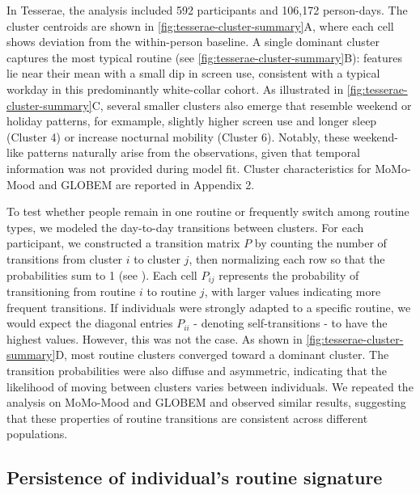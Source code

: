 \documentclass[pdflatex,sn-vancouver,Numbered]{bst/sn-jnl}%
\theoremstyle{thmstyleone}%
\theoremstyle{thmstyletwo}%
\theoremstyle{thmstylethree}%
\begin{document}
In Tesserae, the analysis included 592 participants and 106,172 person-days. The cluster centroids are shown in \autoref{fig:tesserae-cluster-summary}A, where each cell shows deviation from the within-person baseline. A single dominant cluster captures the most typical routine (see \autoref{fig:tesserae-cluster-summary}B): features lie near their mean with a small dip in screen use, consistent with a typical workday in this predominantly white-collar cohort. As illustrated in \autoref{fig:tesserae-cluster-summary}C, several smaller clusters also emerge that resemble weekend or holiday patterns, for exmample, slightly higher screen use and longer sleep (Cluster 4) or increase nocturnal mobility (Cluster 6). Notably, these weekend-like patterns naturally arise from the observations, given that temporal information was not provided during model fit. Cluster characteristics for MoMo-Mood and GLOBEM are reported in Appendix 2.

To test whether people remain in one routine or frequently switch among routine types, we modeled the day-to-day transitions between clusters. For each participant, we constructed a transition matrix \(P\) by counting the number of transitions from cluster \(i\) to cluster \(j\), then normalizing each row so that the probabilities sum to 1 (see ). Each cell \(P_{ij}\) represents the probability of transitioning from routine \(i\) to routine \(j\), with larger values indicating more frequent transitions. If individuals were strongly adapted to a specific routine, we would expect the diagonal entries \(P_{ii}\) - denoting self-transitions - to have the highest values. However, this was not the case. As shown in \autoref{fig:tesserae-cluster-summary}D, most routine clusters converged toward a dominant cluster. The transition probabilities were also diffuse and asymmetric, indicating that the likelihood of moving between clusters varies between individuals. We repeated the analysis on MoMo-Mood and GLOBEM and observed similar results, suggesting that these properties of routine transitions are consistent across different populations.

\subsection*{Persistence of individual's routine signature} \label{sec:results:signature_persistence}
\end{document}

